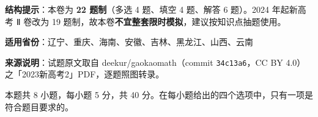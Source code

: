 

\begin{gknotice}
\textbf{结构提示}：本卷为 \textbf{22 题制}（多选 4 题、填空 4 题、解答 6 题）。2024 年起新高考 Ⅱ 卷改为 19 题制，故本卷\textbf{不宜整套限时模拟}，建议按知识点抽题使用。

\textbf{适用省份}：辽宁、重庆、海南、安徽、吉林、黑龙江、山西、云南

\textbf{来源说明}：试题原文取自 deekur/gaokaomath（commit \texttt{34c13a6}，CC BY 4.0）之「2023新高考2」PDF，逐题照图转录。
\end{gknotice}

\par\medskip


\begin{gktip}
本题共 8 小题，每小题 5 分，共 40 分。在每小题给出的四个选项中，只有一项是符合题目要求的。
\end{gktip}

